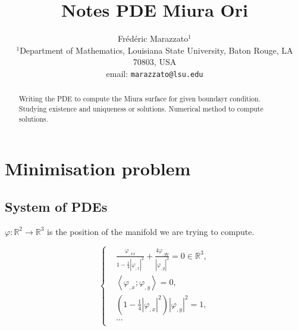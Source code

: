 

\title{Notes PDE Miura Ori}
\author{\begin{minipage}{\textwidth}\centering Fr\'ed\'eric
Marazzato$^{1}$\\
   \small{$^{1}$Department of Mathematics, Louisiana State University, Baton Rouge, LA 70803, USA}\\
   \small{email: \texttt{marazzato@lsu.edu}}\end{minipage}}
      
   


\maketitle

\begin{abstract}
Writing the PDE to compute the Miura surface for given boundayr condition. Studying existence and uniqueness or solutions. Numerical method to compute solutions.
\end{abstract}

\section{Minimisation problem}

\subsection{System of PDEs}

$\varphi : \mathbb{R}^2 \rightarrow \mathbb{R}^3$ is the position of the manifold we are trying to compute.

\begin{equation}
\label{eq:strong form equations}
\left\{
\begin{aligned}
& \frac{\varphi_{,xx}}{1 - \frac14 |\varphi_{,x}|^2} + \frac{4\varphi_{,yy}}{|\varphi_{,y}|^2} = 0 \in \mathbb{R}^3,\\
& \left\langle \varphi_{,x} ; \varphi_{,y} \right\rangle = 0, \\
& (1 - \frac14 |\varphi_{,x}|^2) |\varphi_{,y}|^2 = 1, \\
& ... \\
\end{aligned}
\right.
\end{equation}






